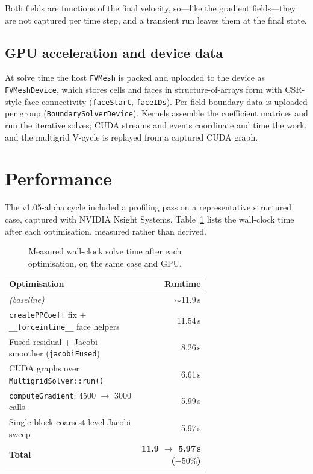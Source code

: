 \documentclass[11pt]{article}
\begin{document}
Both fields are functions of the final velocity, so---like the gradient fields---they
are not captured per time step, and a transient run leaves them at the final state.

\subsection{GPU acceleration and device data}
At solve time the host \texttt{FVMesh} is packed and uploaded to the device as
\texttt{FVMeshDevice}, which stores cells and faces in structure-of-arrays form with
CSR-style face connectivity (\texttt{faceStart}, \texttt{faceIDs}). Per-field boundary
data is uploaded per group (\texttt{BoundarySolverDevice}). Kernels assemble the
coefficient matrices and run the iterative solves; CUDA streams and events coordinate
and time the work, and the multigrid V-cycle is replayed from a captured CUDA graph.

\section{Performance}\label{sec:perf}
The v1.05-alpha cycle included a profiling pass on a representative structured case,
captured with NVIDIA Nsight Systems. Table~\ref{tab:perf} lists the wall-clock time
after each optimisation, measured rather than derived.

\begin{table}[h]
\centering
\caption{Measured wall-clock solve time after each optimisation, on the same case and
GPU.}
\label{tab:perf}
\begin{tabular}{@{}>{\raggedright\arraybackslash}p{0.66\linewidth} r@{}}
\toprule
\textbf{Optimisation} & \textbf{Runtime} \\
\midrule
\emph{(baseline)}                                                & $\sim$11.9\,s \\
\texttt{createPPCoeff} fix + \texttt{\_\_forceinline\_\_} face helpers & 11.54\,s \\
Fused residual + Jacobi smoother (\texttt{jacobiFused})          & 8.26\,s \\
CUDA graphs over \texttt{MultigridSolver::run()}                 & 6.61\,s \\
\texttt{computeGradient}: 4500 $\rightarrow$ 3000 calls          & 5.99\,s \\
Single-block coarsest-level Jacobi sweep                         & 5.97\,s \\
\midrule
\textbf{Total} & \textbf{11.9 $\rightarrow$ 5.97\,s ($-50\%$)} \\
\bottomrule
\end{tabular}
\end{table}
\end{document}
